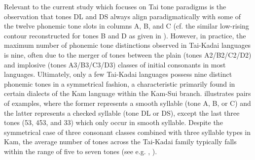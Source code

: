 \documentclass[output=paper]{langscibook}
\begin{document}
Relevant to the current study which focuses on Tai tone paradigms is the observation that tones DL and DS always align paradigmatically with some of the twelve phonemic tone slots in columns A, B, and C (cf. the similar low-rising contour reconstructed for tones B and D as given in \citealt[271]{Pittayaporn2009}). However, in practice, the maximum number of phonemic tone distinctions observed in Tai-Kadai languages is nine, often due to the merger of tones between the plain (tones A2/B2/C2/D2) and implosive (tones A3/B3/C3/D3) classes of initial consonants in most languages. Ultimately, only a few Tai-Kadai languages possess nine distinct phonemic tones in a symmetrical fashion, a characteristic primarily found in certain dialects of the Kam language within the Kam-Sui branch.  illustrates pairs of examples, where the former represents a smooth syllable (tone A, B, or C) and the latter represents a checked syllable (tone DL or DS), except the last three tones (53, 453, and 33) which only occur in smooth syllable.
Despite the symmetrical case of three consonant classes combined with three syllable types in Kam, the average number of tones across the Tai-Kadai family typically falls within the range of five to seven tones (see e.g. \citealt{Brown1985}, \citealt{Hudak2008}).
\end{document}

